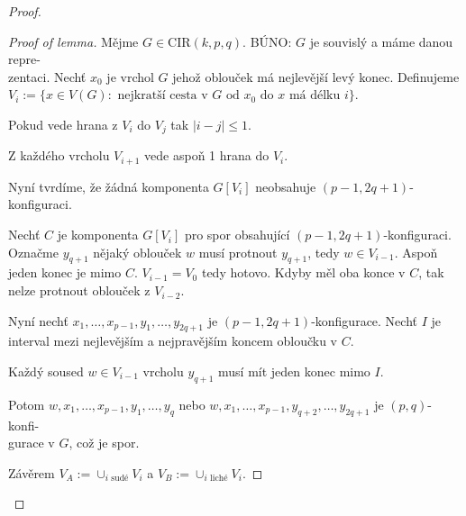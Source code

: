 \begin{proof}
	\begin{proof}[Proof of lemma]
		Mějme $G \in \text{CIR}(k,p,q)$. BÚNO: $G$ je souvislý a máme danou repre-\\zentaci. Nechť $x_0$ je vrchol $G$ jehož oblouček má nejlevější levý konec. Definujeme $V_i := \{x \in V(G) : \text{ nejkratší cesta v } G \text{ od } x_0 \text{ do } x \text{ má délku } i\}$.
		
		\begin{observ}
			Pokud vede hrana z $V_i$ do $V_j$ tak $|i - j| \leq 1$.
		\end{observ}
		
		\begin{observ}
			Z každého vrcholu $V_{i+1}$ vede aspoň 1 hrana do $V_i$.
		\end{observ}
		
		Nyní tvrdíme, že žádná komponenta $G[V_i]$ neobsahuje $(p-1, 2q + 1)$-konfiguraci.
		
		Nechť $C$ je komponenta $G[V_i]$ pro spor obsahující $(p-1, 2q + 1)$-konfiguraci. Označme $y_{q+1}$ nějaký oblouček $w$ musí protnout $y_{q+1}$, tedy $w \in V_{i-1}$. Aspoň jeden konec je mimo $C$. $V_{i-1} = V_0$ tedy hotovo. Kdyby měl oba konce v $C$, tak nelze protnout oblouček z $V_{i-2}$.
		
		Nyní nechť $x_1, \dots, x_{p-1}, y_{1}, \dots, y_{2q+1}$ je $(p-1, 2q + 1)$-konfigurace. Nechť $I$ je interval mezi nejlevějším a nejpravějším koncem obloučku v $C$.
		
		\begin{observ}
			Každý soused $w \in V_{i-1}$ vrcholu $y_{q+1}$ musí mít jeden konec mimo $I$.
		\end{observ}
		
		Potom $w, x_1, \dots, x_{p-1}, y_{1}, \dots, y_q$ nebo $w, x_1, \dots, x_{p-1}, y_{q+2}, \dots, y_{2q+1}$ je $(p,q)$-konfi-\\gurace v $G$, což je spor.
		
		Závěrem $V_{A} := \cup_{i \text{ sudé}} V_{i}$ a $V_{B} := \cup_{i \text{ liché}} V_{i}$.
	\end{proof}
\end{proof}